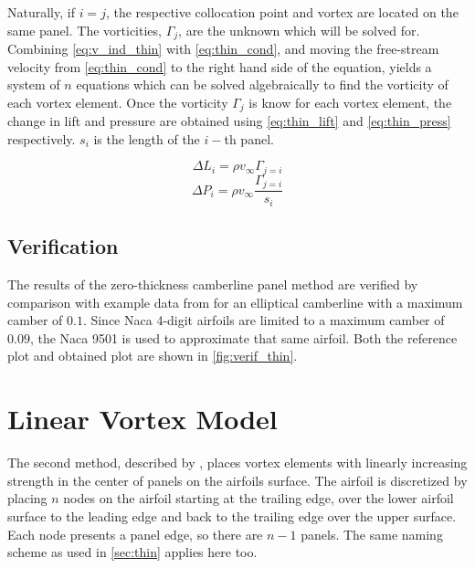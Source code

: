 Naturally, if $i=j$, the respective collocation point and vortex are located
on the same panel. The vorticities, $\Gamma_j$, are the unknown which will be solved for.
Combining \autoref{eq:v_ind_thin} with \autoref{eq:thin_cond}, and moving the free-stream
velocity from \autoref{eq:thin_cond} to the right hand side of the equation,  yields a
system of $n$ equations which can be solved algebraically to find the vorticity of each vortex element.
Once the vorticity $\Gamma_j$ is know for each vortex element, the change in lift and
pressure are obtained using \autoref{eq:thin_lift} and \autoref{eq:thin_press} respectively.
 $s_i$ is the length of the $i-$th panel.

\begin{equation}
\label{eq:thin_lift}
\Delta L_i = \rho v_\infty \Gamma_{j=i}
\end{equation}
\begin{equation}
\label{eq:thin_press}
\Delta P_i = \rho v_\infty \frac{\Gamma_{j=i}}{s_i}
\end{equation}

\subsection{Verification}
The results of the zero-thickness camberline panel method are verified by
comparison with example data from \citeauthor{katz_plotkin} for an elliptical
camberline with a maximum camber of $0.1$. Since Naca 4-digit airfoils are
limited to a maximum camber of $0.09$, the Naca 9501 is used to approximate that
same airfoil. Both the reference plot and obtained plot are shown in \autoref{fig:verif_thin}.


\section{Linear Vortex Model}
\label{sec:thick}
The second method, described by %
\citeauthor{kuethe_chow_1998}\cite{kuethe_chow_1998}, places vortex elements
with linearly increasing strength in the center of panels on the airfoils
surface. The airfoil is discretized by placing $n$ nodes on the airfoil starting
at the trailing edge, over the lower airfoil surface to the leading edge and
back to the trailing edge over the upper surface. Each node presents a panel
edge, so there are $n-1$ panels. The same naming scheme as used in
\autoref{sec:thin} applies here too.

